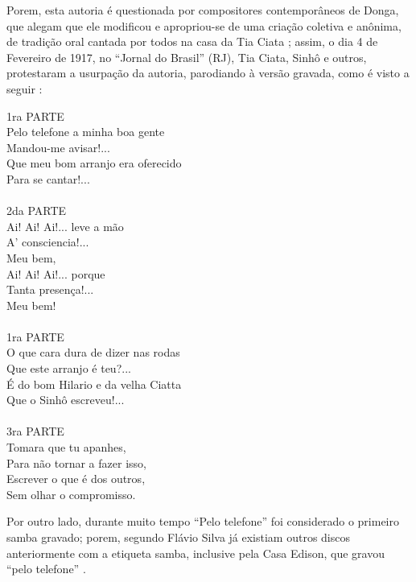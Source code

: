Porem, esta autoria é questionada por compositores contemporâneos de Donga, que alegam que
ele modificou e apropriou-se de uma criação coletiva e anônima, 
de tradição oral cantada por todos na casa da Tia Ciata \cite{musicapelotelefone} \cite[pp. 35]{diniz2006almanaque} \cite[pp. 49]{diniz2008almanaque};
assim, o dia 4 de Fevereiro de 1917, no ``Jornal do Brasil'' (RJ), Tia Ciata, Sinhô e outros,
protestaram a usurpação da autoria, parodiando à versão gravada, como é visto a seguir \cite[pp. 17]{TiaCiataVsDonga} \cite[pp. 118-119]{sandroni2001feitico}:
\begin{citando}%
\begin{center}
1ra PARTE\\
Pelo telefone a minha boa gente\\
Mandou-me avisar!...\\
Que meu bom arranjo era oferecido\\
Para se cantar!...\\
~\\
2da PARTE\\
Ai! Ai! Ai!... leve a mão\\
A' consciencia!...\\
Meu bem,\\
Ai! Ai! Ai!... porque\\
Tanta presença!...\\
Meu bem!\\
~\\
1ra PARTE\\
O que cara dura de dizer nas rodas\\
Que este arranjo é teu?...\\
É do bom Hilario e da velha Ciatta\\
Que o Sinhô escreveu!...\\
~\\
3ra PARTE\\
Tomara que tu apanhes,\\
Para não tornar a fazer isso,\\
Escrever o que é dos outros,\\
Sem olhar o compromisso.
\end{center}
\end{citando}%

Por outro lado, durante muito tempo ``Pelo telefone'' foi considerado o primeiro samba gravado;
porem, segundo Flávio Silva  já existiam outros discos anteriormente com a etiqueta samba,
inclusive pela Casa Edison, que gravou ``pelo telefone''  \cite[pp. 96]{hertzman2013making} \cite[pp. 118]{sandroni2001feitico}.

